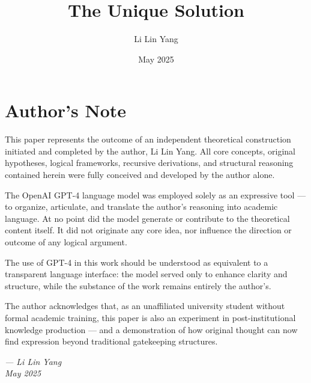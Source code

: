\documentclass[12pt]{article}
\begin{document}
\title{The Unique Solution}
\author{Li Lin Yang}
\date{May 2025}
\maketitle

\section*{Author’s Note}

This paper represents the outcome of an independent theoretical construction initiated and completed by the author, Li Lin Yang. All core concepts, original hypotheses, logical frameworks, recursive derivations, and structural reasoning contained herein were fully conceived and developed by the author alone.

The OpenAI GPT-4 language model was employed solely as an expressive tool — to organize, articulate, and translate the author's reasoning into academic language. At no point did the model generate or contribute to the theoretical content itself. It did not originate any core idea, nor influence the direction or outcome of any logical argument.

The use of GPT-4 in this work should be understood as equivalent to a transparent language interface: the model served only to enhance clarity and structure, while the substance of the work remains entirely the author’s.

The author acknowledges that, as an unaffiliated university student without formal academic training, this paper is also an experiment in post-institutional knowledge production — and a demonstration of how original thought can now find expression beyond traditional gatekeeping structures.

\bigskip
\noindent\textit{--- Li Lin Yang} \\
\textit{May 2025}
\end{document}
